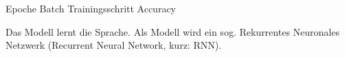 
\printglossaries

Epoche
Batch
Trainingsschritt
Accuracy

Das Modell lernt die Sprache.
Als Modell wird ein sog. Rekurrentes Neuronales Netzwerk (Recurrent Neural Network, kurz: RNN).


